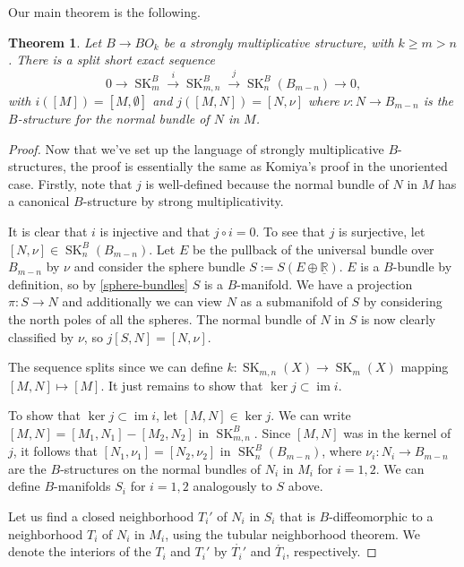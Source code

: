 \documentclass{amsart}
\newtheorem{thm}{Theorem}[section]
\theoremstyle{definition}
\theoremstyle{remark}
\newcommand{\R}{\mathbb{R}}
\newcommand{\im}{\operatorname{im}}
\newcommand{\SK}{\operatorname{SK}}
\begin{document}
Our main theorem is the following.

\begin{thm}
\label{main-thm}
    Let $B\to BO_k$ be a strongly multiplicative structure, with $k\geq m > n$. There is a split short exact sequence
    \[0\to \SK^B_m \xrightarrow{i} \SK^B_{m,n} \xrightarrow{j} \SK^{B}_n(B_{m-n}) \to 0,\]
    with $i([M]) = [M,\emptyset]$ and $j([M,N]) = [N,\nu]$ where $\nu: N \to B_{m-n}$ is the $B$-structure for the normal bundle of $N$ in $M$.
\end{thm}


\begin{proof}
    Now that we've set up the language of strongly multiplicative $B$-structures, the proof is essentially the same as Komiya's proof in the unoriented case. Firstly, note that $j$ is well-defined because the normal bundle of $N$ in $M$ has a canonical $B$-structure by strong multiplicativity.

    It is clear that $i$ is injective and that $j\circ i = 0$. To see that $j$ is surjective, let $[N,\nu]\in\SK_n^B(B_{m-n})$. Let $E$ be the pullback of the universal bundle over $B_{m-n}$ by $\nu$ and consider the sphere bundle $S:=S(E\oplus\underline{\R})$. $E$ is a $B$-bundle by definition, so by \cref{sphere-bundles} $S$ is a $B$-manifold. We have a projection $\pi:S\to N$ and additionally we can view $N$ as a submanifold of $S$ by considering the north poles of all the spheres. The normal bundle of $N$ in $S$ is now clearly classified by $\nu$, so $j[S,N] = [N,\nu]$.
    
    The sequence splits since we can define $k:\SK_{m,n}(X)\to \SK_m(X)$ mapping $[M,N] \mapsto [M]$. It just remains to show that $\ker j \subset \im i$.
    
    To show that $\ker j \subset \im i$, let $[M,N]\in\ker j$. We can write $[M,N] = [M_1,N_1] - [M_2, N_2]$ in $\SK_{m,n}^B$. Since $[M,N]$ was in the kernel of $j$, it follows that $[N_1,\nu_1] = [N_2,\nu_2]$ in $\SK_n^B(B_{m-n})$, where $\nu_i:N_i \to B_{m-n}$ are the $B$-structures on the normal bundles of $N_i$ in $M_i$ for $i=1,2$. We can define $B$-manifolds $S_i$ for $i=1,2$ analogously to $S$ above.

    Let us find a closed neighborhood $T_i'$ of $N_i$ in $S_i$ that is $B$-diffeomorphic to a neighborhood $T_i$ of $N_i$ in $M_i$, using the tubular neighborhood theorem. We denote the interiors of the $T_i$ and $T_i'$ by $\mathring{T_i'}$ and $\mathring{T_i}$, respectively.


\end{proof}
\end{document}

